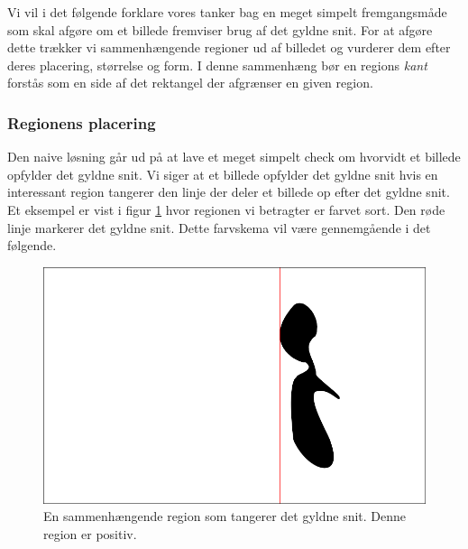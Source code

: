 {
\def\imgscale{0.34}

\textsf{Vi vil i det følgende forklare vores tanker bag en meget simpelt
fremgangsmåde som skal afgøre om et billede fremviser brug af det gyldne
snit. For at afgøre dette trækker vi sammenhængende regioner ud af
billedet og vurderer dem efter deres placering, størrelse og form. I
denne sammenhæng bør en regions \emph{kant} forstås som en side af det
rektangel der afgrænser en given region.}

\subsubsection{Regionens placering}
Den naive løsning går ud på at lave et meget simpelt check om hvorvidt
et billede opfylder det gyldne snit. Vi siger at et billede
opfylder det gyldne snit hvis en interessant region tangerer den linje
der deler et billede op efter det gyldne snit. Et eksempel er vist i figur
\ref{pos_naiv_1} hvor regionen vi betragter er farvet sort. Den røde
linje markerer det gyldne snit. Dette farvskema vil være gennemgående i
det følgende.
\begin{figure}[h]
	\begin{center}
		\includegraphics[scale=\imgscale,angle=0]{afsnit/vores_implementation/billeder/naiv_algoritme/naiv_positiv_blob_1}
	\end{center}
	\caption[En positiv region]{En sammenhængende region som tangerer det gyldne snit.
	Denne region er positiv.}
	\label{pos_naiv_1}
\end{figure}

}
